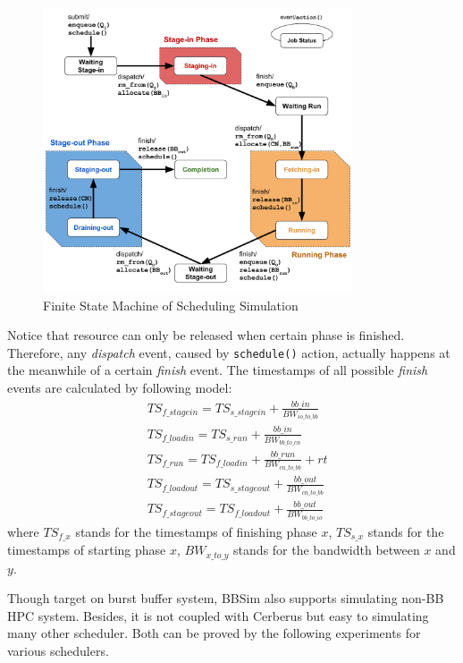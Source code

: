 \begin{figure}[!t]
\centering
        \includegraphics[width=3.6in]{3PhaseJobFSM}
        \caption{Finite State Machine of Scheduling Simulation}
\label{Fig:JobFSM}
\end{figure}

Notice that resource can only be released when certain phase is finished.
Therefore, any \textit{dispatch} event, caused by \texttt{schedule()} action, actually happens
at the meanwhile of a certain \textit{finish} event.
The timestamps of all possible \textit{finish} events are calculated by following model:
\begin{align}
        & TS_{f\_stagein} = TS_{s\_stagein} + \frac{bb\_in}{BW_{io\_to\_bb}}\label{Equ:FinIn} \\
        & TS_{f\_loadin} = TS_{s\_run} + \frac{bb\_in}{BW_{bb\_to\_cn}}\label{Equ:FinMemIn} \\
        & TS_{f\_run} = TS_{f\_loadin} + \frac{bb\_run}{BW_{cn\_to\_bb}} + rt\label{Equ:FinRun} \\
        & TS_{f\_loadout} = TS_{s\_stageout} + \frac{bb\_out}{BW_{cn\_to\_bb}}\label{Equ:FinMemOut} \\
        & TS_{f\_stageout} = TS_{f\_loadout} + \frac{bb\_out}{BW_{bb\_to\_io}} \label{Equ:FinOut}
\end{align}
where $TS_{f\_x}$ stands for the timestamps of finishing phase $x$,
$TS_{s\_x}$ stands for the timestamps of starting phase $x$,
$BW_{x\_to\_y}$ stands for the bandwidth between $x$ and $y$.

Though target on burst buffer system, BBSim also supports simulating non-BB HPC system.
Besides, it is not coupled with Cerberus but easy to simulating many other scheduler.
Both can be proved by the following experiments for various schedulers.

